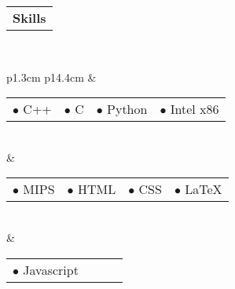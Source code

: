 \documentclass[a4paper,12pt]{extarticle}
\begin{document}
 \raggedright{\begin{tabular}[b]{p{5.5cm}}
	\bf{\Large{Skills}} \\
    \cline{1-1}
\end{tabular}} \\ \smallskip \smallskip \smallskip \smallskip \smallskip
\begin{tabular}[b]{p{1.3cm} p{14.4cm}}
	&\begin{tabular}[b]{p{2.8cm} p{2.8cm} p{2.8cm} p{2.8cm}}
    $\bullet$ C++ & $\bullet$ C & $\bullet$ Python & $\bullet$ Intel x86
    \end{tabular} \medskip \\
    &\begin{tabular}[b]{p{2.8cm} p{2.8cm} p{2.8cm} p{2.8cm}}
    $\bullet$ MIPS & $\bullet$ HTML & $\bullet$ CSS & $\bullet$ \LaTeX
    \end{tabular} \medskip \\
    &\begin{tabular}[b]{p{2.8cm} p{2.8cm} p{2.8cm} p{2.8cm}}
    $\bullet$ Javascript
    \end{tabular} \\
\end{tabular}
\end{document}
